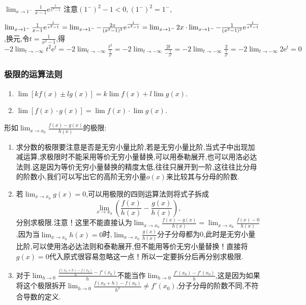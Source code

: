 \begin{enumerate}
\begin{examp}{$\lim_{x \to 1^{-}} \frac{1}{x-1}\mathrm{e} ^{\frac{1}{x^2-1}}$}
    \jie 注意$(1^-)^2-1<0,(1^-)^2=1^-$,
    
    $\lim_{x \to 1^{-}} \frac{1}{x-1}\mathrm{e} ^{\frac{1}{x^2-1}}=\lim_{x \to 1^{-}} -\frac{2x}{(x^2-1)^2}\mathrm{e} ^{\frac{1}{x^2-1}}\\
    =\lim_{x \to 1^{-}} 2x\cdot\lim_{x \to 1^{-}} -\frac{1}{(x^2-1)^2}\mathrm{e} ^{\frac{1}{x^2-1}}$,换元,令$t=\frac{1}{x^2-1}$,得$-2 \lim_{t \to -\infty} t^2 \mathrm{e} ^t=-2 \lim_{t \to -\infty} \frac{t^2}{\frac{1}{\mathrm{e} ^t}}=-2 \lim_{t \to -\infty} \frac{2t}{-\frac{1}{\mathrm{e} ^t}}=-2 \lim_{t \to -\infty} \frac{2}{\frac{1}{\mathrm{e} ^t}}=-2 \lim_{t \to -\infty} 2 \mathrm{e} ^t=0$
\end{examp}

\end{enumerate}

\subsubsection{极限的运算法则}
\begin{enumerate}
    \item $\lim \left[k f(x) \pm l g(x)\right] =k\lim f(x)+l\lim g(x)$.
    \item $\lim \left[f(x)\cdot g(x)\right] =\lim f(x)\cdot \lim g(x)$.
\end{enumerate}

形如$\displaystyle \lim_{x \to x_0} \frac{f(x)-g(x)}{h(x)}$的极限:
\begin{enumerate}
    \item 求分数的极限要注意是否是无穷小量比阶,若是无穷小量比阶,当式子中出现加减运算,求极限时不能采用等价无穷小量替换,可以用泰勒展开,也可以用洛必达法则.这是因为等价无穷小量替换的精度太低,往往只展开到一阶,这往往比分母的阶数小,我们可以写出它的高阶无穷小量$o(x)$来比较其与分母的阶数.
    
    \item 若$\lim_{x \to x_0} g(x)=0$,可以用极限的四则运算法则将式子拆成
    \begin{equation*}
        \lim_{x \to x_0} \left(\frac{f(x)}{h(x)}-\frac{g(x)}{h(x)}\right) ,
    \end{equation*}
    分别求极限.注意！这里不能直接认为$\lim_{x \to x_0} \frac{f(x)-g(x)}{h(x)}=\lim_{x \to x_0} \frac{f(x)-0}{h(x)}$,因为当$\lim_{x \to x_0} h(x)=0$时,$\lim_{x \to x_0} \frac{g(x)}{h(x)}$分子分母都为0,此时是无穷小量比阶,可以使用洛必达法则和泰勒展开,但不能用等价无穷小量替换！直接将$g(x)=0$代入原式很容易忽略这一点！所以一定要拆分后再分别求极限.

    \item 对于$\displaystyle \lim_{h \to 0} \frac{\frac{f(x_0+h)-f(x_0)}{h}-f'(x_0)}{h}$不能当作$\displaystyle \lim_{h \to 0} \frac{f'(x_0)-f'(x_0)}{h}$,这是因为如果将这个极限拆开$\lim_{h \to 0} \frac{f(x_0+h)-f(x_0)}{h^2}\neq f'(x_0)$,分子分母的阶数不同,不符合导数的定义.
\end{enumerate}

